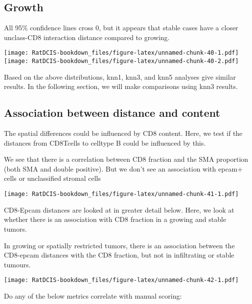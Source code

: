 \documentclass[
]{book}
\begin{document}
\hypertarget{growth}{%
\subsection{Growth}\label{growth}}

All 95\% confidence lines cross 0, but it appears that stable cases have a closer unclass-CD8 interaction distance compared to growing.

\texttt{[image: RatDCIS-bookdown\_files/figure-latex/unnamed-chunk-40-1.pdf]} \texttt{[image: RatDCIS-bookdown\_files/figure-latex/unnamed-chunk-40-2.pdf]}

Based on the above distributions, knn1, knn3, and knn5 analyses give similar results. In the following section, we will make comparisons using knn3 results.

\hypertarget{association-between-distance-and-content}{%
\subsection{Association between distance and content}\label{association-between-distance-and-content}}

The spatial differences could be influenced by CD8 content. Here, we test if the distances from CD8Tcells to celltype B could be influenced by this.

We see that there is a correlation between CD8 fraction and the SMA proportion (both SMA and double positive).
But we don't see an association with epcam+ cells or unclassified stromal cells

\texttt{[image: RatDCIS-bookdown\_files/figure-latex/unnamed-chunk-41-1.pdf]}

CD8-Epcam distances are looked at in greater detail below. Here, we look at whether there is an association with CD8 fraction in a growing and stable tumors.

In growing or spatially restricted tumors, there is an association between the CD8-epcam distances with the CD8 fraction, but not in infiltrating or stable tumours.

\texttt{[image: RatDCIS-bookdown\_files/figure-latex/unnamed-chunk-42-1.pdf]}

Do any of the below metrics correlate with manual scoring:
\end{document}
